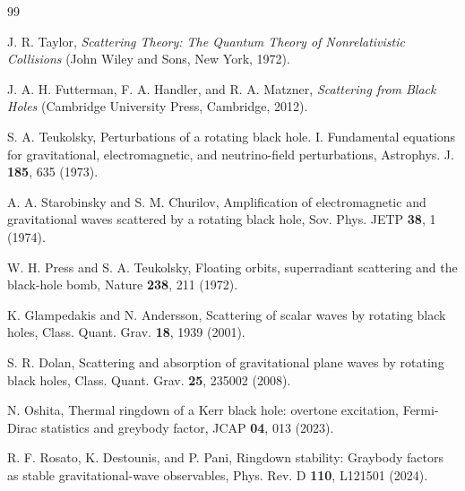 \documentclass[aps,prd,twocolumn,nofootinbib,superscriptaddress,10pt,floatfix]{revtex4-2}
\begin{document}
\begin{thebibliography}{99}

J. R. Taylor,
\textit{Scattering Theory: The Quantum Theory of Nonrelativistic Collisions}
(John Wiley and Sons, New York, 1972).

J. A. H. Futterman, F. A. Handler, and R. A. Matzner,
\textit{Scattering from Black Holes}
(Cambridge University Press, Cambridge, 2012).

S. A. Teukolsky,
Perturbations of a rotating black hole. I. Fundamental equations for
gravitational, electromagnetic, and neutrino-field perturbations,
Astrophys. J. \textbf{185}, 635 (1973).

A. A. Starobinsky and S. M. Churilov,
Amplification of electromagnetic and gravitational waves scattered by a
rotating black hole,
Sov. Phys. JETP \textbf{38}, 1 (1974).

W. H. Press and S. A. Teukolsky,
Floating orbits, superradiant scattering and the black-hole bomb,
Nature \textbf{238}, 211 (1972).

K. Glampedakis and N. Andersson,
Scattering of scalar waves by rotating black holes,
Class. Quant. Grav. \textbf{18}, 1939 (2001).

S. R. Dolan,
Scattering and absorption of gravitational plane waves by rotating black holes,
Class. Quant. Grav. \textbf{25}, 235002 (2008).

N. Oshita,
Thermal ringdown of a Kerr black hole: overtone excitation, Fermi-Dirac
statistics and greybody factor,
JCAP \textbf{04}, 013 (2023).

R. F. Rosato, K. Destounis, and P. Pani,
Ringdown stability: Graybody factors as stable gravitational-wave observables,
Phys. Rev. D \textbf{110}, L121501 (2024).

\end{thebibliography}
\end{document}
